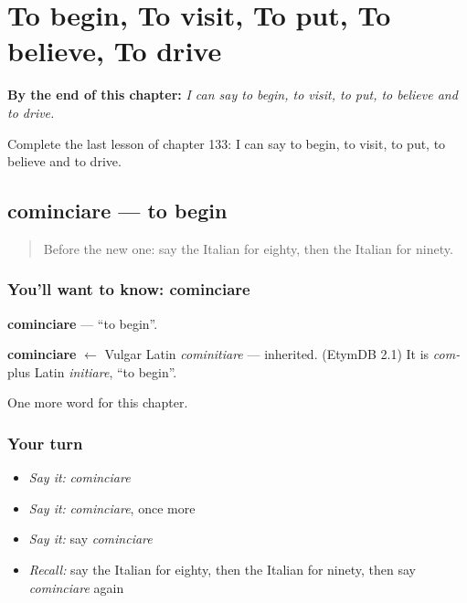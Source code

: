 
\chapter{To begin, To visit, To put, To believe, To drive}
\label{ch:it-to-begin-to-visit-to-put-to-believe-to-drive}

\begin{chapteropening}
\textbf{By the end of this chapter:} \emph{I can say to begin, to visit, to put, to believe and to drive.}

Complete the last lesson of chapter 133: I can say to begin, to visit, to put, to believe and to drive.
\end{chapteropening}

\section[cominciare]{cominciare — to begin}

\label{lesson:IT-C133-cominciare}



\begin{quote}
Before the new one: say the Italian for eighty, then the Italian for ninety.
\end{quote}

\subsection*{You'll want to know: cominciare}
\textbf{cominciare} — \textquotedblleft{}to begin\textquotedblright{}.

\begin{cousinweb}
\textbf{cominciare} $\leftarrow$ Vulgar Latin \emph{cominitiare} — inherited. (EtymDB 2.1) It is \emph{com-} plus Latin \emph{initiare}, \textquotedblleft{}to begin\textquotedblright{}.
\end{cousinweb}

\begin{grammarlens}[title={What you've built}]
One more word for this chapter.
\end{grammarlens}

\subsection*{Your turn}
\begin{itemize}
\raggedright
  \item \emph{Say it:} \emph{cominciare}
  \item \emph{Say it:} \emph{cominciare}, once more
  \item \emph{Say it:} say \emph{cominciare}
  \item \emph{Recall:} say the Italian for eighty, then the Italian for ninety, then say \emph{cominciare} again
\end{itemize}

